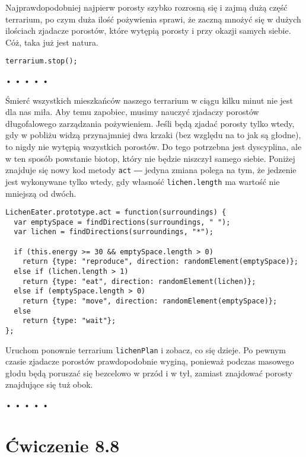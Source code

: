 Najprawdopodobniej najpierw porosty szybko rozrosną się i zajmą dużą część terrarium, po czym duża ilość pożywienia sprawi, że zaczną mnożyć się w dużych ilościach zjadacze porostów, które wytępią porosty i przy okazji samych siebie. Cóż, taka już jest natura.

  
\begin{verbatim} 
terrarium.stop();
 \end{verbatim}


\begin{center}
• • • • •
\end{center}

  
Śmierć wszystkich mieszkańców naszego terrarium w ciągu kilku minut nie jest dla nas miła. Aby temu zapobiec, musimy nauczyć zjadaczy porostów długofalowego zarządzania pożywieniem. Jeśli będą zjadać porosty tylko wtedy, gdy w pobliżu widzą przynajmniej dwa krzaki (bez względu na to jak są głodne), to nigdy nie wytępią wszystkich porostów. Do tego potrzebna jest dyscyplina, ale w ten sposób powstanie biotop, który nie będzie niszczył samego siebie. Poniżej znajduje się nowy kod metody \texttt{act} ― jedyna zmiana polega na tym, że jedzenie jest wykonywane tylko wtedy, gdy własność \texttt{lichen.length} ma wartość nie mniejszą od dwóch.

  
\begin{verbatim} 
LichenEater.prototype.act = function(surroundings) {
  var emptySpace = findDirections(surroundings, " ");
  var lichen = findDirections(surroundings, "*");

  if (this.energy >= 30 && emptySpace.length > 0)
    return {type: "reproduce", direction: randomElement(emptySpace)};
  else if (lichen.length > 1)
    return {type: "eat", direction: randomElement(lichen)};
  else if (emptySpace.length > 0)
    return {type: "move", direction: randomElement(emptySpace)};
  else
    return {type: "wait"};
};
 \end{verbatim}
  
Uruchom ponownie terrarium \texttt{lichenPlan} i zobacz, co się dzieje. Po pewnym czasie zjadacze porostów prawdopodobnie wyginą, ponieważ podczas masowego głodu będą poruszać się bezcelowo w przód i w tył, zamiast znajdować porosty znajdujące się tuż obok.



\begin{center}
• • • • •
\end{center}

  
\section*{Ćwiczenie 8.8}
\label{sec:8.8}
  
